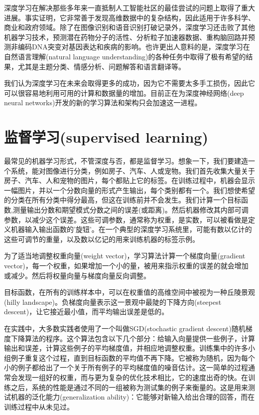 深度学习在解决那些多年来一直抵制人工智能社区的最佳尝试的问题上取得了重大进展。事实证明，它非常善于发现高维数据中的复杂结构，因此适用于许多科学、商业和政府领域。除了在图像识别和语音识别打破记录外，深度学习还击败了其他机器学习技术，预测潜在药物分子的活性、分析粒子加速器数据、重构脑回路并预测非编码DNA突变对基因表达和疾病的影响。也许更出人意料的是，深度学习在自然语言理解(natural language understanding)的各种任务中取得了极有希望的结果，尤其是主题分类、情感分析、问题解答和语言翻译等。

我们认为深度学习在未来会取得更多的成功，因为它不需要太多手工损伤，因此它可以很容易地利用可用的计算和数据量的增加。目前正在为深度神经网络(deep neural networks)开发的新的学习算法和架构只会加速这一进程。

\section{监督学习(supervised learning)}
最常见的机器学习形式，不管深度与否，都是监督学习。想象一下，我们要建造一个系统，能对图像进行分类，例如房子、汽车、人或宠物。我们首先收集大量关于房子、汽车、人和宠物的图片，每个都贴上它的标签。在训练过程中，机器会显示一幅图片，并以一个分数向量的形式产生输出，每个类别都有一个。我们想使希望的分类在所有分类中得分最高，但这在训练前并不会发生。我们计算一个目标函数,测量输出分数和期望模式分数之间的误差(或距离)。然后机器修改其内部可调参数，以减少这个误差。这些可调参数，通常称为权重，是实数，可以被看做是定义机器输入输出函数的'旋钮'。在一个典型的深度学习系统里，可能有数以亿计的这些可调节的重量，以及数以亿记的用来训练机器的标签示例。

为了适当地调整权重向量(weight vector)，学习算法计算一个梯度向量(gradient vector)，每一个权重，如果增加一个小的量，被用来指示权重的误差的就会增加或减少。然后将权量向量与梯度向量反向调整。

目标函数，在所有的训练样本中，可以在权重值的高维空间中被视为一种丘陵景观(hilly landscape)。负梯度向量表示这一景观中最陡的下降方向(steepest descent)，让它接近最小值，而平均输出误差是低的。

在实践中，大多数实践者使用了一个叫做SGD(stochastic gradient descent)随机梯度下降算法的程序。这个算法包含以下几个部分：给输入向量提供一些例子，计算输出和误差，计算这些例子的平均梯度值，并相应地调整权重。训练集中的许多小组例子重复这个过程，直到目标函数的平均值不再下降。它被称为随机，因为每个小的例子都给出了一个关于所有例子的平均梯度值的噪音估计。这一简单的过程通常会发现一组好的权重，而与更为复杂的优化技术相比，它的速度出奇的快。在训练之后，系统的性能是通过不同的一组被称为测试集的例子来衡量的。这是用来测试机器的泛化能力(generalization ability)：它能够对新输入给出合理的回答，而在训练过程中从未见过。

